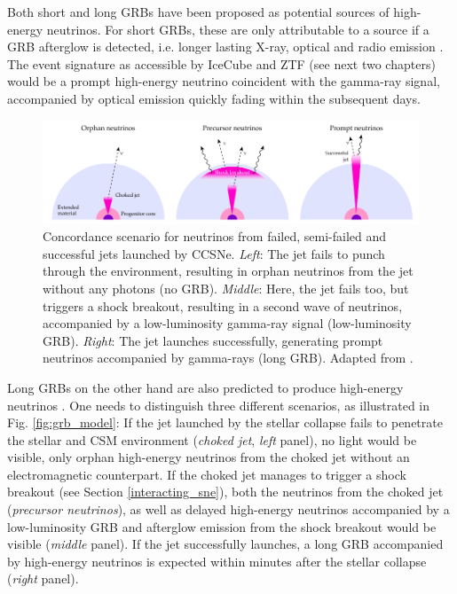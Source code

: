 \documentclass[
    a4paper, %
    fontsize=10pt, %
    twoside=false, %
    numbers=noenddot, %
    fontmethod=tex,
]{kaobook}
\begin{document}
Both short and long GRBs have been proposed as potential sources of high-energy neutrinos. For short GRBs, these are only attributable to a source if a GRB afterglow is detected, i.e. longer lasting X-ray, optical and radio emission . The event signature as accessible by IceCube and ZTF (see next two chapters) would be a prompt high-energy neutrino coincident with the gamma-ray signal, accompanied by optical emission quickly fading within the subsequent days.

\begin{figure}[htb]
    \includegraphics[width=1\textwidth]{theory/grb_model.pdf}
    \caption[High-energy neutrinos from GRBs]{Concordance scenario for neutrinos from failed, semi-failed and successful jets launched by CCSNe. \textit{Left}: The jet fails to punch through the environment, resulting in orphan neutrinos from the jet without any photons (no GRB). \textit{Middle}: Here, the jet fails too, but triggers a shock breakout, resulting in a second wave of neutrinos, accompanied by a low-luminosity gamma-ray signal (low-luminosity GRB). \textit{Right}: The jet launches successfully, generating prompt neutrinos accompanied by gamma-rays (long GRB). Adapted from \cite{Senno2016}.}
\end{figure}

Long GRBs on the other hand are also predicted to produce high-energy neutrinos . One needs to distinguish three different scenarios, as illustrated in Fig. \ref{fig:grb_model}: If the jet launched by the stellar collapse fails to penetrate the stellar and CSM environment (\textit{choked jet}, \textit{left} panel), no light would be visible, only orphan high-energy neutrinos from the choked jet without an electromagnetic counterpart. If the choked jet manages to trigger a shock breakout (see Section \ref{interacting_sne}), both the neutrinos from the choked jet (\textit{precursor neutrinos}), as well as delayed high-energy neutrinos accompanied by a low-luminosity GRB and afterglow emission from the shock breakout would be visible (\textit{middle} panel). If the jet successfully launches, a long GRB accompanied by high-energy neutrinos is expected within minutes after the stellar collapse (\textit{right} panel).
\end{document}
